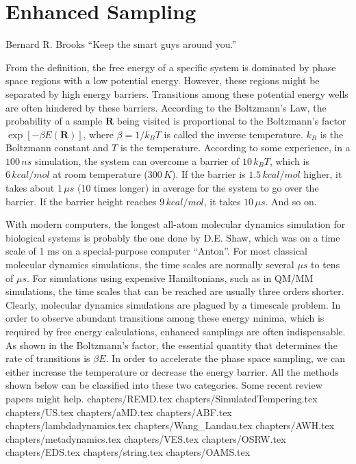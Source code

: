 \chapter{Enhanced Sampling\label{chapter:ES}}
\begin{chapquote}{Bernard R. Brooks%
	}
	``Keep the smart guys around you.''
\end{chapquote}
From the definition, the free energy of a specific system is dominated by phase space regions with a low potential energy. However, these regions might be separated by high energy barriers. Transitions among these potential energy wells are often hindered by these barriers. According to the Boltzmann's Law, the probability of a sample $\mathbf{R}$ being visited is proportional to the Boltzmann's factor $\exp{\left[-\beta E(\mathbf{R})\right]}$, where $\beta=1/k_BT$ is called the inverse temperature. $k_B$ is the Boltzmann constant and $T$ is the temperature. According to some experience, in a $100\, ns$ simulation, the system can overcome a barrier of $10\, k_BT$, which is $6\, kcal/mol$ at room temperature ($300\, K$). If the barrier is $1.5\, kcal/mol$ higher, it takes about $1\, \mu s$ (10 times longer) in average for the system to go over the barrier. If the barrier height reaches $9\, kcal/mol$, it takes $10\,\mu s$. And so on. 

With modern computers, the longest all-atom molecular dynamics simulation for biological systems is probably the one done by D.E. Shaw, which was on a time scale of 1 ms on a special-purpose computer ``Anton''. For most classical molecular dynamics simulations, the time scales are normally several $\mu s$ to tens of $\mu s$. For simulations using expensive Hamiltonians, such as in QM/MM simulations, the time scales that can be reached are usually three orders shorter. Clearly, molecular dynamics simulations are plagued by a timescale problem. In order to observe abundant transitions among these energy minima, which is required by free energy calculations, enhanced samplings are often indispensable. As shown in the Boltzmann's factor, the essential quantity that determines the rate of transitions is $\beta E$. In order to accelerate the phase space sampling, we can either increase the temperature or decrease the energy barrier. All the methods shown below can be classified into these two categories. Some recent review papers might help.\cite{ZuckermanARB2011,BernardiBBA2015,KamenikPCCP2022,ChenCOSB2022}
\clearpage 
 {chapters/REMD.tex}
\clearpage
 {chapters/SimulatedTempering.tex}
\clearpage
 {chapters/US.tex}
\clearpage
 {chapters/aMD.tex}
\clearpage
 {chapters/ABF.tex}
\clearpage 
 {chapters/lambdadynamics.tex}
\clearpage 
 {chapters/Wang_Landau.tex}
\clearpage 
 {chapters/AWH.tex}
\clearpage
 {chapters/metadynamics.tex}
\clearpage 
 {chapters/VES.tex}
\clearpage 
 {chapters/OSRW.tex}
\clearpage
 {chapters/EDS.tex}
%
\clearpage
 {chapters/string.tex}
\clearpage
 {chapters/OAMS.tex}
